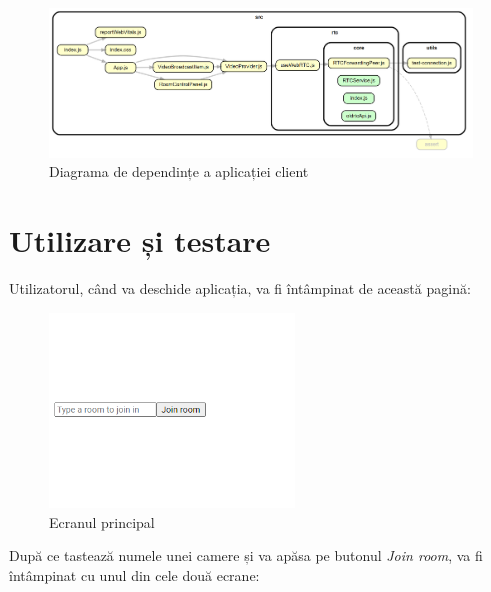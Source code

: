 \begin{figure}[H]
    \centering
    \includegraphics[width=15cm]{figures/app_frontend_dependency_diagram.png}
    \caption{Diagrama de dependințe a aplicației client}
\end{figure}
\section{Utilizare și testare}
\indent \par Utilizatorul, când va deschide aplicația, va fi întâmpinat de această pagină:
\begin{figure}[H]
    \centering
    \includegraphics[width=6.5cm]{figures/app_welcome_screen.png}
    \caption{Ecranul principal}
\end{figure}
\indent \par După ce tastează numele unei camere și va apăsa pe butonul \textit{Join room}, va fi întâmpinat cu unul din cele două ecrane:
